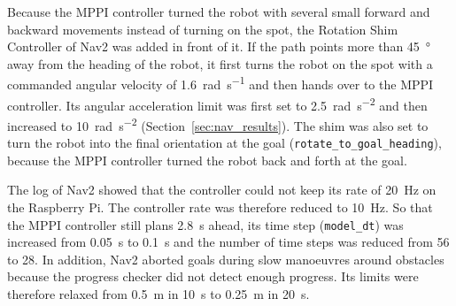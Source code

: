 Because the MPPI controller turned the robot with several small forward and backward movements instead of turning on the spot, the Rotation Shim Controller of Nav2 was added in front of it. If the path points more than \SI{45}{\degree} away from the heading of the robot, it first turns the robot on the spot with a commanded angular velocity of \SI{1.6}{\radian\per\second} and then hands over to the MPPI controller. Its angular acceleration limit was first set to \SI{2.5}{\radian\per\second\squared} and then increased to \SI{10}{\radian\per\second\squared} (Section~\ref{sec:nav_results}). The shim was also set to turn the robot into the final orientation at the goal (\texttt{rotate\_to\_goal\_heading}), because the MPPI controller turned the robot back and forth at the goal.

The log of Nav2 showed that the controller could not keep its rate of \SI{20}{\hertz} on the Raspberry Pi. The controller rate was therefore reduced to \SI{10}{\hertz}. So that the MPPI controller still plans \SI{2.8}{\second} ahead, its time step (\texttt{model\_dt}) was increased from \SI{0.05}{\second} to \SI{0.1}{\second} and the number of time steps was reduced from 56 to 28. In addition, Nav2 aborted goals during slow manoeuvres around obstacles because the progress checker did not detect enough progress. Its limits were therefore relaxed from \SI{0.5}{\metre} in \SI{10}{\second} to \SI{0.25}{\metre} in \SI{20}{\second}.

